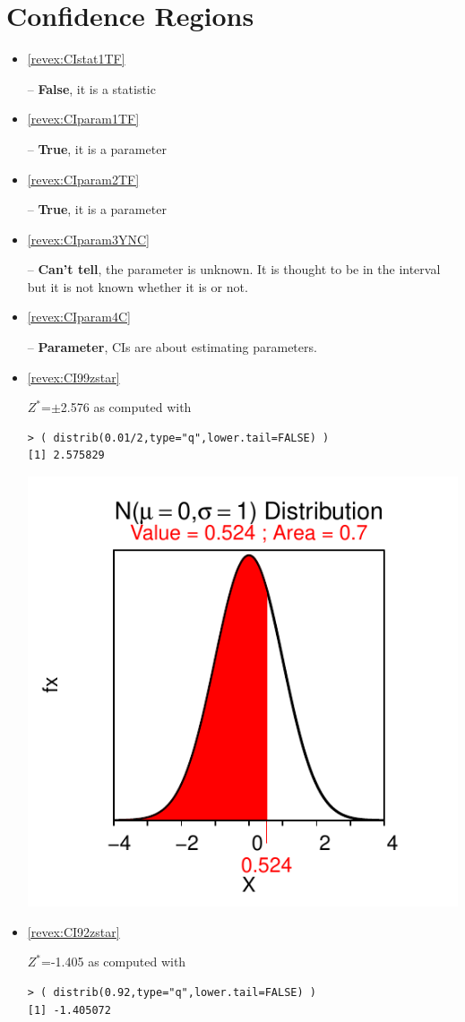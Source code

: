 \documentclass[10pt,openany]{book}\usepackage[]{graphicx}\usepackage[]{color}
\makeatletter
\newenvironment{kframe}{%
 \def\at@end@of@kframe{}%
 \ifinner\ifhmode%
  \def\at@end@of@kframe{\end{minipage}}%
  \begin{minipage}{\columnwidth}%
 \fi\fi%
 \def\FrameCommand##1{\hskip\@totalleftmargin \hskip-\fboxsep
 \colorbox{shadecolor}{##1}\hskip-\fboxsep
     \hskip-\linewidth \hskip-\@totalleftmargin \hskip\columnwidth}%
 \MakeFramed {\advance\hsize-\width
   \@totalleftmargin\z@ \linewidth\hsize
   \@setminipage}}%
 {\par\unskip\endMakeFramed%
 \at@end@of@kframe}
\newenvironment{knitrout}{}{} %
\makeatother
\begin{document}
\section*{Confidence Regions}
\begin{itemize}
  \item \hypertarget{ans:CIstat1TF}{\ref{revex:CIstat1TF}} -- \textbf{False}, it is a statistic
  \item \hypertarget{ans:CIparam1TF}{\ref{revex:CIparam1TF}} -- \textbf{True}, it is a parameter
  \item \hypertarget{ans:CIparam2TF}{\ref{revex:CIparam2TF}} -- \textbf{True}, it is a parameter
  \item \hypertarget{ans:CIparam3YNC}{\ref{revex:CIparam3YNC}} -- \textbf{Can't tell}, the parameter is unknown.  It is thought to be in the interval but it is not known whether it is or not.
  \item \hypertarget{ans:CIparam4C}{\ref{revex:CIparam4C}} -- \textbf{Parameter}, CIs are about estimating parameters.

  \item \hypertarget{ans:CI99zstar}{\ref{revex:CI99zstar}} $Z^{*}$=$\pm$2.576 as computed with
\begin{knitrout}
\color{fgcolor}\begin{kframe}
\begin{verbatim}
> ( distrib(0.01/2,type="q",lower.tail=FALSE) )
[1] 2.575829
\end{verbatim}
\end{kframe}

{\centering \includegraphics[width=.4\linewidth]{Figs/unnamed-chunk-332-1} 

}



\end{knitrout}
  \item \hypertarget{ans:CI92zstar}{\ref{revex:CI92zstar}} $Z^{*}$=-1.405 as computed with
\begin{knitrout}
\color{fgcolor}\begin{kframe}
\begin{verbatim}
> ( distrib(0.92,type="q",lower.tail=FALSE) )
[1] -1.405072
\end{verbatim}
\end{kframe}


\end{knitrout}
\end{itemize}
\end{document}
